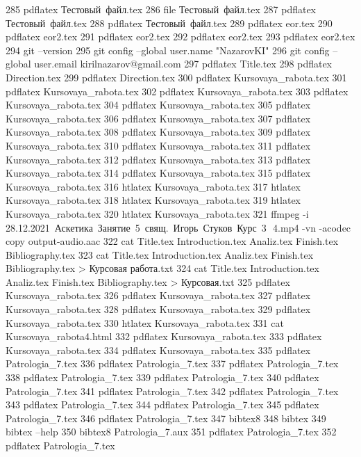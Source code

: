   285  pdflatex Тестовый\ файл.tex 
  286  file Тестовый\ файл.tex 
  287  pdflatex Тестовый\ файл.tex 
  288  pdflatex Тестовый\ файл.tex 
  289  pdflatex eor.tex 
  290  pdflatex eor2.tex 
  291  pdflatex eor2.tex 
  292  pdflatex eor2.tex 
  293  pdflatex eor2.tex 
  294  git --version
  295  git config --global user.name "NazarovKI"
  296  git config --global user.email kirilnazarov@gmail.com
  297  pdflatex Title.tex 
  298  pdflatex Direction.tex 
  299  pdflatex Direction.tex 
  300  pdflatex Kursovaya_rabota.tex 
  301  pdflatex Kursovaya_rabota.tex 
  302  pdflatex Kursovaya_rabota.tex 
  303  pdflatex Kursovaya_rabota.tex 
  304  pdflatex Kursovaya_rabota.tex 
  305  pdflatex Kursovaya_rabota.tex 
  306  pdflatex Kursovaya_rabota.tex 
  307  pdflatex Kursovaya_rabota.tex 
  308  pdflatex Kursovaya_rabota.tex 
  309  pdflatex Kursovaya_rabota.tex 
  310  pdflatex Kursovaya_rabota.tex 
  311  pdflatex Kursovaya_rabota.tex 
  312  pdflatex Kursovaya_rabota.tex 
  313  pdflatex Kursovaya_rabota.tex 
  314  pdflatex Kursovaya_rabota.tex 
  315  pdflatex Kursovaya_rabota.tex 
  316  htlatex Kursovaya_rabota.tex 
  317  htlatex Kursovaya_rabota.tex 
  318  htlatex Kursovaya_rabota.tex 
  319  htlatex Kursovaya_rabota.tex 
  320  htlatex Kursovaya_rabota.tex 
  321  ffmpeg -i 28.12.2021\ Аскетика\ Занятие\ 5\ свящ.\ Игорь\ Стуков\ Курс\ 3\,\ 4.mp4 -vn -acodec copy output-audio.aac
  322  cat Title.tex Introduction.tex Analiz.tex Finish.tex Bibliography.tex 
  323  cat Title.tex Introduction.tex Analiz.tex Finish.tex Bibliography.tex > Курсовая работа.txt
  324  cat Title.tex Introduction.tex Analiz.tex Finish.tex Bibliography.tex > Курсовая.txt
  325  pdflatex Kursovaya_rabota.tex 
  326  pdflatex Kursovaya_rabota.tex 
  327  pdflatex Kursovaya_rabota.tex 
  328  pdflatex Kursovaya_rabota.tex 
  329  pdflatex Kursovaya_rabota.tex 
  330  htlatex Kursovaya_rabota.tex 
  331  cat Kursovaya_rabota4.html 
  332  pdflatex Kursovaya_rabota.tex 
  333  pdflatex Kursovaya_rabota.tex 
  334  pdflatex Kursovaya_rabota.tex 
  335  pdflatex Patrologia_7.tex 
  336  pdflatex Patrologia_7.tex 
  337  pdflatex Patrologia_7.tex 
  338  pdflatex Patrologia_7.tex 
  339  pdflatex Patrologia_7.tex 
  340  pdflatex Patrologia_7.tex 
  341  pdflatex Patrologia_7.tex 
  342  pdflatex Patrologia_7.tex 
  343  pdflatex Patrologia_7.tex 
  344  pdflatex Patrologia_7.tex 
  345  pdflatex Patrologia_7.tex 
  346  pdflatex Patrologia_7.tex 
  347  bibtex8
  348  bibtex
  349  bibtex --help
  350  bibtex8 Patrologia_7.aux 
  351  pdflatex Patrologia_7.tex 
  352  pdflatex Patrologia_7.tex 
